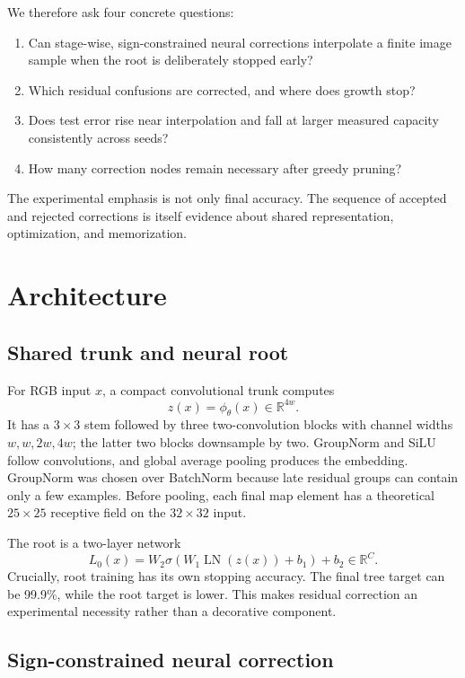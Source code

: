 \documentclass[11pt,a4paper]{article}
\begin{document}
We therefore ask four concrete questions:

\begin{enumerate}
  \item Can stage-wise, sign-constrained neural corrections interpolate a
  finite image sample when the root is deliberately stopped early?
  \item Which residual confusions are corrected, and where does growth stop?
  \item Does test error rise near interpolation and fall at larger measured
  capacity consistently across seeds?
  \item How many correction nodes remain necessary after greedy pruning?
\end{enumerate}

The experimental emphasis is not only final accuracy. The sequence of accepted
and rejected corrections is itself evidence about shared representation,
optimization, and memorization.

\section{Architecture}

\subsection{Shared trunk and neural root}

For RGB input \(x\), a compact convolutional trunk computes
\[
z(x)=\phi_\theta(x)\in\mathbb{R}^{4w}.
\]
It has a \(3\times3\) stem followed by three two-convolution blocks with
channel widths \(w,w,2w,4w\); the latter two blocks downsample by two.
GroupNorm and SiLU follow convolutions, and global average pooling produces
the embedding. GroupNorm was chosen over BatchNorm because late residual
groups can contain only a few examples. Before pooling, each final map element
has a theoretical \(25\times25\) receptive field on the \(32\times32\)
input.

The root is a two-layer network
\[
L_0(x)=W_2\sigma\!\left(W_1\operatorname{LN}(z(x))+b_1\right)+b_2
\in\mathbb{R}^{C}.
\]
Crucially, root training has its own stopping accuracy. The final tree target
can be 99.9\%, while the root target is lower. This makes residual correction
an experimental necessity rather than a decorative component.

\subsection{Sign-constrained neural correction}
\end{document}
